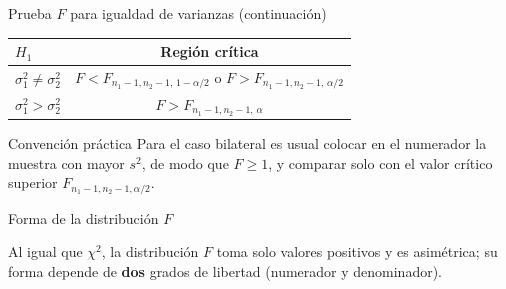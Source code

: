 \documentclass[aspectratio=169,11pt]{beamer}
\begin{document}
\begin{frame}{Prueba $F$ para igualdad de varianzas (continuación)}
\begin{table}[]
\centering
\small
\begin{tabular}{@{}lc@{}}
\toprule
$H_1$ & Región crítica \\
\midrule
$\sigma_1^2\neq\sigma_2^2$ & $F<F_{n_1-1,n_2-1,\,1-\alpha/2}$ o $F>F_{n_1-1,n_2-1,\,\alpha/2}$ \\
$\sigma_1^2>\sigma_2^2$ & $F>F_{n_1-1,n_2-1,\,\alpha}$ \\
\bottomrule
\end{tabular}
\end{table}
\begin{alertblock}{Convención práctica}
Para el caso bilateral es usual colocar en el numerador la muestra con mayor $s^2$, de modo que $F\ge1$, y comparar solo con el valor crítico superior $F_{n_1-1,n_2-1,\alpha/2}$.
\end{alertblock}
\end{frame}

\begin{frame}{Forma de la distribución $F$}
\centering
{}
\vspace{0.2cm}

Al igual que $\chi^2$, la distribución $F$ toma solo valores positivos y es asimétrica; su forma depende de \textbf{dos} grados de libertad (numerador y denominador).
\end{frame}
\end{document}
